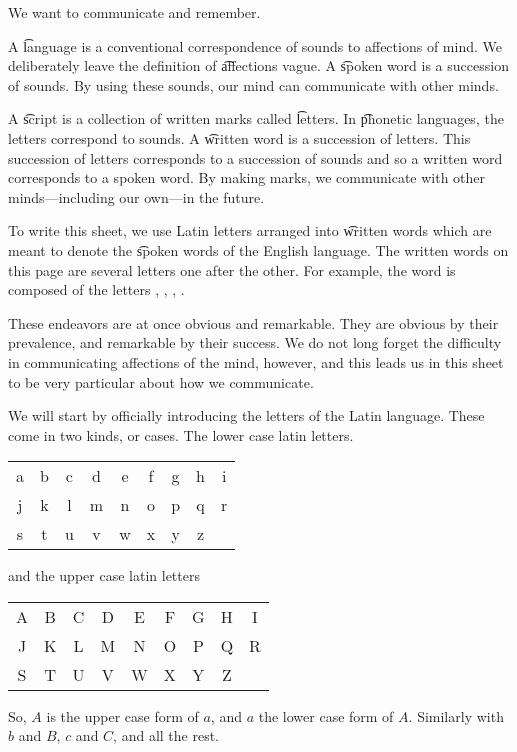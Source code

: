 

We want to communicate and remember.


A \t{language} is a conventional correspondence of sounds to affections of mind.
We deliberately leave the definition of \t{affections} vague.
A \t{spoken word} is a succession of sounds.
By using these sounds, our mind can communicate with other minds.

A \t{script} is a collection of written marks called \t{letters}.
In \t{phonetic} languages, the letters correspond to sounds.
A \t{written word} is a succession of letters.
This succession of letters corresponds to a succession of sounds and so a written word corresponds to a spoken word.
By making marks, we communicate with other minds---including our own---in the future.

To write this sheet, we use Latin letters arranged into \t{written words} which are meant to denote the \t{spoken words} of the English language.
The written words on this page are several letters one after the other.
For example, the word  is composed of the letters , , , .

These endeavors are at once obvious and remarkable.
They are obvious by their prevalence, and remarkable by their success.
We do not long forget the difficulty in communicating affections of the mind, however, and this leads us in this sheet to be very particular about how we communicate.


We will start by officially introducing the letters of the Latin language.
These come in two kinds, or cases.
The lower case latin letters.
\begin{center}
\begin{tabular}{ccccccccc}
  a & b & c & d & e & f & g & h & i \\
  j & k & l & m & n & o & p & q & r \\
  s & t & u & v & w & x & y & z &   \\
\end{tabular}
\end{center}
and the upper case latin letters
\begin{center}
\begin{tabular}{ccccccccc}
  A & B & C & D & E & F & G & H & I \\
  J & K & L & M & N & O & P & Q & R \\
  S & T & U & V & W & X & Y & Z &   \\
\end{tabular}
\end{center}
So, $A$ is the upper case form of $a$, and $a$ the lower case form of $A$.
Similarly with $b$ and $B$, $c$ and $C$, and all the rest.
